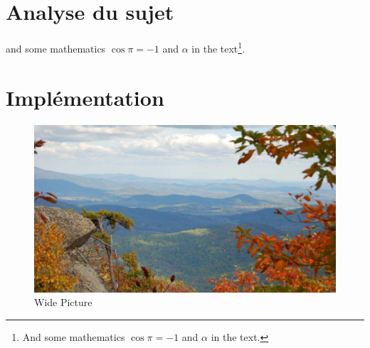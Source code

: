 \documentclass[fleqn,10pt,french]{SelfArx} %
\affiliation{*\textbf{Code source}: https://github.com/lyx-x/Rubik}
\begin{document}
\flushbottom %

\maketitle %

\renewcommand{\contentsname}{Table des matières}
\tableofcontents %

\thispagestyle{empty} %


\section{Analyse du sujet} %

\lipsum[1-3] %
 and some mathematics $\cos\pi=-1$ and $\alpha$ in the text\footnote{And some mathematics $\cos\pi=-1$ and $\alpha$ in the text.}.


\section{Implémentation}

\begin{figure}[ht]\centering %
\includegraphics[width=\linewidth]{view}
\caption{Wide Picture}
\label{fig:view}
\end{figure}
\end{document}
